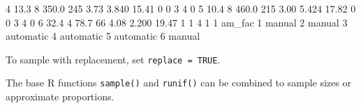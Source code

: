 \documentclass[
]{book}
\newenvironment{Shaded}{\begin{snugshade}}{\end{snugshade}}
\newcommand{\DecValTok}[1]{\textcolor[rgb]{0.00,0.00,0.81}{#1}}
\newcommand{\FloatTok}[1]{\textcolor[rgb]{0.00,0.00,0.81}{#1}}
\newcommand{\NormalTok}[1]{#1}
\begin{document}
\begin{Shaded}
\begin{Highlighting}[]
\DecValTok{4} \FloatTok{13.3}         \DecValTok{8} \FloatTok{350.0} \DecValTok{245}       \FloatTok{3.73}  \FloatTok{3.840} \FloatTok{15.41}      \DecValTok{0}  \DecValTok{0}    \DecValTok{3}    \DecValTok{4}     \DecValTok{0}
\DecValTok{5} \FloatTok{10.4}         \DecValTok{8} \FloatTok{460.0} \DecValTok{215}       \FloatTok{3.00}  \FloatTok{5.424} \FloatTok{17.82}      \DecValTok{0}  \DecValTok{0}    \DecValTok{3}    \DecValTok{4}     \DecValTok{0}
\DecValTok{6} \FloatTok{32.4}         \DecValTok{4}  \FloatTok{78.7}  \DecValTok{66}       \FloatTok{4.08}  \FloatTok{2.200} \FloatTok{19.47}      \DecValTok{1}  \DecValTok{1}    \DecValTok{4}    \DecValTok{1}     \DecValTok{1}
\NormalTok{     am\_fac}
\DecValTok{1}\NormalTok{    manual}
\DecValTok{2}\NormalTok{    manual}
\DecValTok{3}\NormalTok{ automatic}
\DecValTok{4}\NormalTok{ automatic}
\DecValTok{5}\NormalTok{ automatic}
\DecValTok{6}\NormalTok{    manual}
\end{Highlighting}
\end{Shaded}

To sample with replacement, set \texttt{replace\ =\ TRUE}.

The base R functions \texttt{sample()} and \texttt{runif()} can be combined to sample sizes or approximate proportions.
\end{document}
